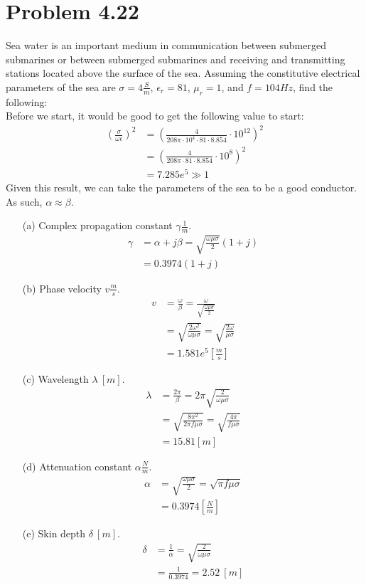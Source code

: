 \documentclass[12pt]{article}
\begin{document}
\section*{Problem 4.22}
Sea water is an important medium in communication between submerged submarines or between submerged submarines and receiving and transmitting stations located above the surface of the sea. Assuming the constitutive electrical parameters of the sea are $\sigma = 4 \frac{S}{m}$, $\epsilon_r = 81$, $\mu_r = 1$, and $f = 104 Hz$, find the following:\\
Before we start, it would be good to get the following value to start:
\begin{align*}
  \left(\frac{\sigma}{\omega\epsilon}\right)^2 &= \left(\frac{4}{208\pi\cdot 10^4\cdot 81\cdot 8.854}\cdot10^{12}\right)^2\\
                                               &= \left(\frac{4}{208\pi\cdot 81\cdot 8.854}\cdot10^{8}\right)^2 \\
                                               &= 7.285e^5 \gg 1
\end{align*}
Given this result, we can take the parameters of the sea to be a good conductor. As such, $\alpha \approx \beta$.
\begin{itemize}
\item[(a)] Complex propagation constant $\gamma \frac{1}{m}$.
  \begin{align*}
    \gamma &= \alpha + j\beta = \sqrt{\frac{\omega \mu\sigma}{2}}(1+j)\\
    &=0.3974(1+j)
  \end{align*}
\item[(b)] Phase velocity $v \frac{m}{s}$.
  \begin{align*}
    v &= \frac{\omega}{\beta} = \frac{\omega}{\sqrt{\frac{\omega \mu\sigma}{2}}}\\
      &= \sqrt{\frac{2\omega^2}{\omega \mu\sigma}} = \sqrt{\frac{2\omega}{\mu\sigma}}\\
      &=1.581e^5 \left[\frac{m}{s}\right]
  \end{align*}
\item[(c)] Wavelength $\lambda\ [m]$.
  \begin{align*}
    \lambda &= \frac{2\pi}{\beta} = 2\pi\sqrt{\frac{2}{\omega\mu\sigma}}\\
            &= \sqrt{\frac{8\pi^2}{2\pi f\mu\sigma}} = \sqrt{\frac{4\pi}{f\mu\sigma}}\\
            &= 15.81 [m]
  \end{align*}
\item[(d)] Attenuation constant $\alpha \frac{N}{m}$.
  \begin{align*}
    \alpha &= \sqrt{\frac{\omega \mu\sigma}{2}}=\sqrt{\pi f \mu\sigma}\\
           & = 0.3974 \left[\frac{N}{m}\right]
  \end{align*}
\item[(e)] Skin depth $\delta\ [m]$.
  \begin{align*}
    \delta &= \frac{1}{\alpha} = \sqrt{\frac{2}{\omega \mu\sigma}}\\
    & = \frac{1}{0.3974} = 2.52\ [m]
  \end{align*}
\end{itemize}
\end{document}
